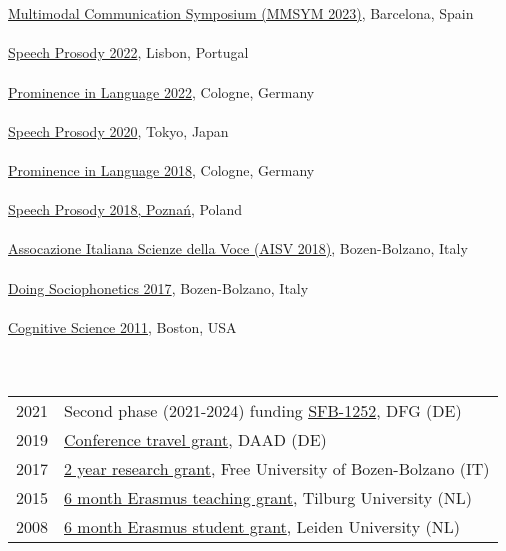 \documentclass[a4paper,11pt]{article}
\begin{document}
\section*{}
\href{http://mmsym.org/}{Multimodal Communication Symposium (MMSYM 2023)}, Barcelona, Spain\\\\
\href{http://labfon.letras.ulisboa.pt/sp2022/}{Speech Prosody 2022}, Lisbon, Portugal\\\\
\href{https://sfb1252.uni-koeln.de/icpl-iii-2022/}{Prominence in Language 2022}, Cologne, Germany\\\\
\href{https://sp2020.jpn.org/}{Speech Prosody 2020}, Tokyo, Japan\\\\
\href{https://sfb1252.uni-koeln.de/prominenceconference2018.html}{Prominence in Language 2018}, Cologne, Germany\\\\
\href{http://sp9.home.amu.edu.pl/}{Speech Prosody 2018, Pozna\'{n}}, Poland\\\\
\href{https://aisv2018.events.unibz.it/}{Assocazione Italiana Scienze della Voce (AISV 2018)}, Bozen-Bolzano, Italy\\\\
\href{https://sites.google.com/site/sopho2017/}{Doing Sociophonetics 2017}, Bozen-Bolzano, Italy\\\\
\href{https://mindmodeling.org/cogsci2011/}{Cognitive Science 2011}, Boston, USA\\\\

\newpage
\section*{}
\begin{table}[ht!]
\begin{center}
\def\arraystretch{1.5}
\begin{tabular}{p{1.5cm}p{13.5cm}} 
2021 & Second phase (2021-2024) funding \href{https://sfb1252.uni-koeln.de/}{SFB-1252}, DFG (DE)\\
 2019 & \href{https://www.daad.de/ausland/studieren/stipendium/de/70-stipendien-finden-und-bewerben/?status=&target=&subjectGrps=&daad=&q=kongressreisen&page=1&detail=57369745}{Conference travel grant}, DAAD (DE)\\ 
 2017 & \href{https://alps.projects.unibz.it/research/speakup/}{2 year research grant}, Free University of Bozen-Bolzano (IT)\\
2015 & \href{https://ec.europa.eu/programmes/erasmus-plus/opportunities/staff-teaching_en}{6 month Erasmus teaching grant}, Tilburg University (NL)\\
2008 & \href{https://ec.europa.eu/programmes/erasmus-plus/opportunities/students_en}{6 month Erasmus student grant}, Leiden University (NL)\\
\end{tabular}
\end{center}
\end{table}
\end{document}
